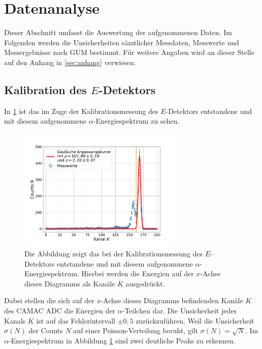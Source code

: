 \section{Datenanalyse}

Dieser Abschnitt umfasst die Auswertung der aufgenommenen Daten.
Im Folgenden werden die Unsicherheiten sämtlicher Messdaten, Messwerte und Messergebnisse nach GUM\cite{1} bestimmt.
Für weitere Angaben wird an dieser Stelle auf den Anhang in \cref{sec:anhang} verwiesen.

\subsection{Kalibration des $E$-Detektors} \label{KaliEDet}

In \cref{EDetectorCalibrationChannelSpectrumEDetector} ist das im Zuge der Kalibrationsmessung des $E$-Detektors entstandene und mit diesem aufgenommene $\alpha$-Energiespektrum zu sehen.
\begin{figure}[ht]
	\centering
	\includegraphics[width=0.7\textwidth]{src/EDetectorCalibrationChannelSpectrumEDetector}
	\caption{Die Abbildung zeigt das bei der Kalibrationsmessung des $E$-Detektors entstandene und mit diesem aufgenommene $\alpha$-Energiespektrum. Hierbei werden die Energien auf der $x$-Achse dieses Diagramms als Kanäle $K$ ausgedrückt.}
	\label{EDetectorCalibrationChannelSpectrumEDetector}
\end{figure}
Dabei stellen die sich auf der $x$-Achse dieses Diagramms befindenden Kanäle $K$ des CAMAC ADC die Energien der $\alpha$-Teilchen dar.
Die Unsicherheit jedes Kanals $K$ ist auf das Fehlerintervall $\pm 0,5$ zurückzuführen.
Weil die Unsicherheit $\sigma(N)$ der Counts $N$ auf einer Poisson-Verteilung beruht, gilt $\sigma(N)=\sqrt{N}$.
Im $\alpha$-Energiespektrum in Abbildung \ref{EDetectorCalibrationChannelSpectrumEDetector} sind zwei deutliche Peaks zu erkennen.

